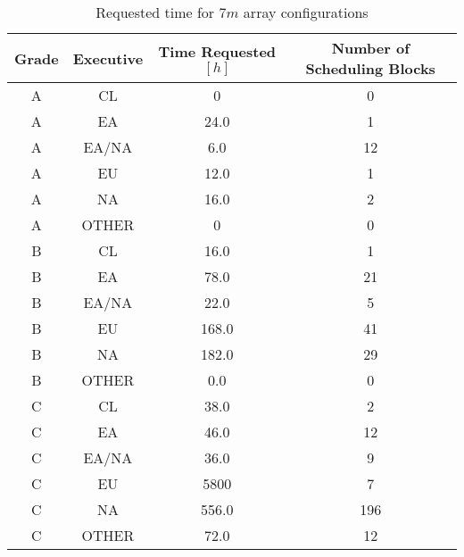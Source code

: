 \begin{table}
\begin{center}
\begin{tabular}{|c|c|c|c|}
\hline
\textbf{Grade} & \textbf{Executive} & \textbf{Time Requested $[h]$} & \textbf{Number of Scheduling Blocks} \\ \hline
A &	CL		& 0  & 0 \\ \hline
A &	EA		& 24.0  & 1 \\ \hline
A &	EA/NA	& 6.0   & 12 \\ \hline
A & EU      & 12.0 & 1 \\ \hline 
A &	NA		& 16.0 & 2 \\ \hline
A & OTHER	& 0		& 0 \\ \hline
B  & CL 	& 16.0		& 1  \\ \hline
B  & EA     & 78.0     & 21 \\ \hline
B  & EA/NA  & 22.0     & 5  \\ \hline
B  & EU     & 168.0     & 41 \\ \hline
B  & NA     & 182.0    & 29 \\ \hline
B  & OTHER  & 0.0      & 0  \\ \hline
C  & CL     & 38.0     & 2  \\ \hline
C  & EA     & 46.0     & 12  \\ \hline
C  & EA/NA  & 36.0      & 9  \\ \hline
C  & EU     & 5800     & 7 \\ \hline
C  & NA     & 556.0     & 196 \\ \hline
C  & OTHER  & 72.0      & 12  \\ \hline
\end{tabular}
\end{center}
\caption{Requested time for $7m$ array configurations}
\label{table:requested-time-7m}
\end{table}

